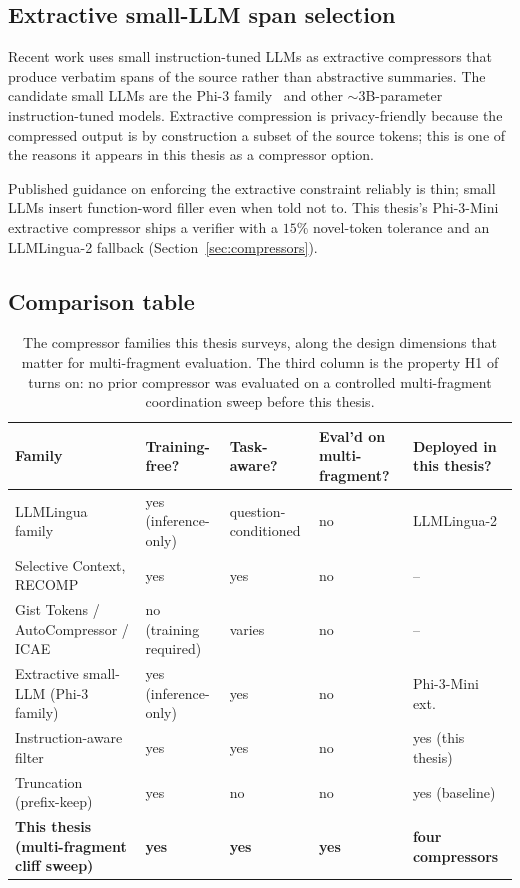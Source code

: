 \subsection{Extractive small-LLM span selection}

Recent work uses small instruction-tuned LLMs as extractive
compressors that produce verbatim spans of the source rather than
abstractive summaries. The candidate small LLMs are the Phi-3
family~\cite{phi3} and other $\sim 3$B-parameter instruction-tuned
models. Extractive compression is privacy-friendly because the
compressed output is by construction a subset of the source
tokens; this is one of the reasons it appears in this thesis as
a compressor option.

Published guidance on enforcing the
extractive constraint reliably is thin; small LLMs insert
function-word filler even when told not to. This thesis's Phi-3-Mini
extractive compressor ships a verifier with a $15\%$ novel-token
tolerance and an LLMLingua-2 fallback (Section~\ref{sec:compressors}).

\subsection{Comparison table}

\begin{table}[htbp]
\centering
\caption{The compressor families this thesis surveys, along the
design dimensions that matter for multi-fragment evaluation. The
third column is the property H1 of 
turns on: no prior compressor was evaluated on a controlled
multi-fragment coordination sweep before this thesis.}
\label{tab:rw_comparison}
\small
\begin{tabular}{p{4.5cm}p{2cm}p{2cm}p{2cm}p{2.5cm}}
\hline
Family & Training\hspace*{0pt}-free? & Task\hspace*{0pt}-aware? & Eval'd on multi\hspace*{0pt}-fragment? & Deployed in this thesis? \\
\hline
LLMLingua family~\cite{jiang2023llmlingua, jiang2024longllmlingua, pan2024llmlingua2} & yes (inference-only) & question-conditioned & no & LLMLingua-2 \\
Selective Context, RECOMP & yes & yes & no & -- \\
Gist Tokens / AutoCompressor / ICAE~\cite{mu2023gist, chevalier2023autocompressor, ge2024icae} & no (training required) & varies & no & -- \\
Extractive small-LLM (Phi-3 family)~\cite{phi3} & yes (inference-only) & yes & no & Phi-3-Mini ext. \\
Instruction-aware filter & yes & yes & no & yes (this thesis) \\
Truncation (prefix-keep) & yes & no & no & yes (baseline) \\
\hline
\textbf{This thesis (multi-fragment cliff sweep)} & \textbf{yes} & \textbf{yes} & \textbf{yes} & \textbf{four compressors} \\
\hline
\end{tabular}
\end{table}

